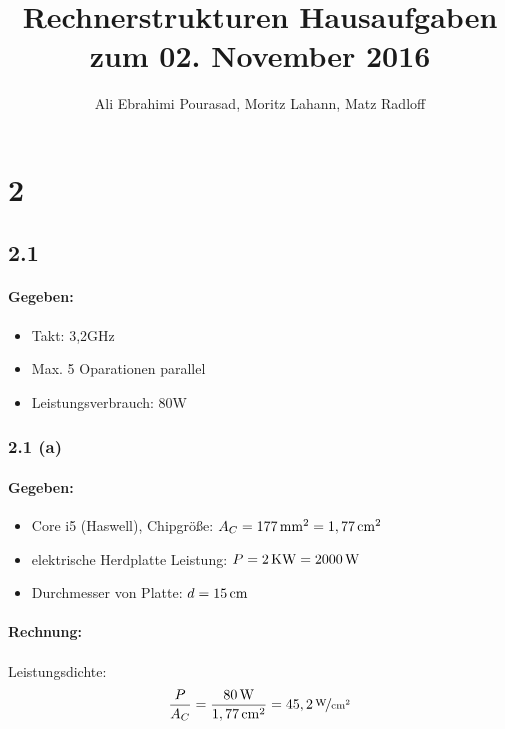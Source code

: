 \documentclass[11pt,a4paper]{article}
\title{\textbf{Rechnerstrukturen Hausaufgaben zum 02. November 2016}}
\author{Ali Ebrahimi Pourasad, Moritz Lahann, Matz Radloff}
\begin{document}
  \maketitle
  \date{}
  \tableofcontents
  \newpage

\section{2} %

\subsection{2.1} %

\paragraph{Gegeben:}
\begin{itemize}
  \item Takt: 3,2GHz
  \item Max. 5 Oparationen parallel
  \item Leistungsverbrauch: 80W
\end{itemize}


\subsubsection{2.1 (a)}
\paragraph{Gegeben:}
\begin{itemize}
  \item Core i5 (Haswell), Chipgröße: $A_C = \unit[177]{mm^2} = \unit[1,77]{cm^2}$
  \item elektrische Herdplatte Leistung: $P = \unit[2]{KW} = \unit[2000]{W}$
  \item Durchmesser von Platte: $d = \unit[15]{cm}$
\end{itemize}

\paragraph{Rechnung:}
\paragraph{}Leistungsdichte:
\begin{equation*}
\frac{P}{A_C} = \frac{\unit[80]{W}}{\unit[1,77]{cm^2}} = \unitfrac[45,2]{W}{cm^2}
\end{equation*}
\end{document}
